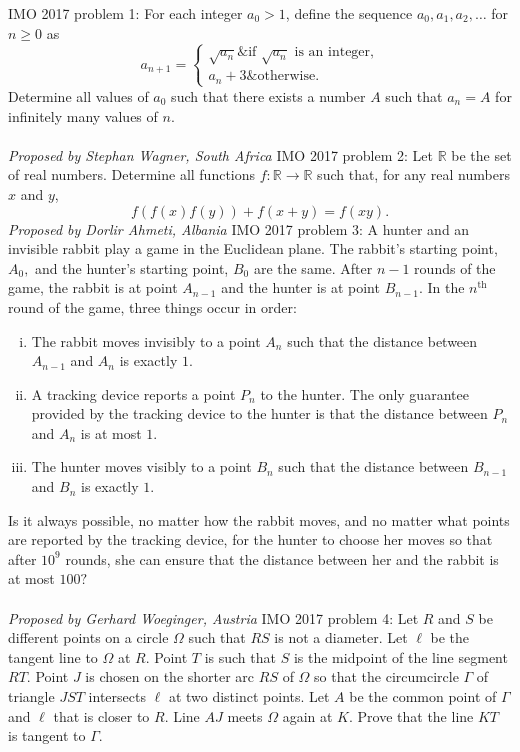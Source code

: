 IMO 2017 problem 1:  For each integer $a_0 > 1$, define the sequence $a_0, a_1, a_2, \ldots$ for $n \geq 0$ as
\[
a_{n+1} =
\begin{cases}
\sqrt{a_n} \& \text{if } \sqrt{a_n} \text{ is an integer,} \\
a_n + 3 \& \text{otherwise.}
\end{cases}
\]
Determine all values of $a_0$ such that there exists a number $A$ such that $a_n = A$ for infinitely many values of $n$. \\\\
\textit{Proposed by Stephan Wagner, South Africa} 
IMO 2017 problem 2:  Let $\mathbb{R}$ be the set of real numbers. Determine all functions $f: \mathbb{R} \rightarrow \mathbb{R}$ such that, for any real numbers $x$ and $y$,
\[ f(f(x)f(y)) + f(x+y) = f(xy). \]
\textit{Proposed by Dorlir Ahmeti, Albania} 
IMO 2017 problem 3:  A hunter and an invisible rabbit play a game in the Euclidean plane. The rabbit's starting point, $A_0,$ and the hunter's starting point, $B_0$ are the same. After $n-1$ rounds of the game, the rabbit is at point $A_{n-1}$ and the hunter is at point $B_{n-1}.$ In the $n^{\text{th}}$ round of the game, three things occur in order:
\begin{enumerate}[i.]
  \item The rabbit moves invisibly to a point $A_n$ such that the distance between $A_{n-1}$ and $A_n$ is exactly $1.$

  \item A tracking device reports a point $P_n$ to the hunter. The only guarantee provided by the tracking device to the hunter is that the distance between $P_n$ and $A_n$ is at most $1.$

  \item The hunter moves visibly to a point $B_n$ such that the distance between $B_{n-1}$ and $B_n$ is exactly $1.$
\end{enumerate}
Is it always possible, no matter how the rabbit moves, and no matter what points are reported by the tracking device, for the hunter to choose her moves so that after $10^9$ rounds, she can ensure that the distance between her and the rabbit is at most $100?$ \\\\
\textit{Proposed by Gerhard Woeginger, Austria} 
IMO 2017 problem 4:  Let $R$ and $S$ be different points on a circle $\Omega$ such that $RS$ is not a diameter. Let $\ell$ be the tangent line to $\Omega$ at $R$. Point $T$ is such that $S$ is the midpoint of the line segment $RT$. Point $J$ is chosen on the shorter arc $RS$ of $\Omega$ so that the circumcircle $\Gamma$ of triangle $JST$ intersects $\ell$ at two distinct points. Let $A$ be the common point of $\Gamma$ and $\ell$ that is closer to $R$. Line $AJ$ meets $\Omega$ again at $K$. Prove that the line $KT$ is tangent to $\Gamma$. \\\\
